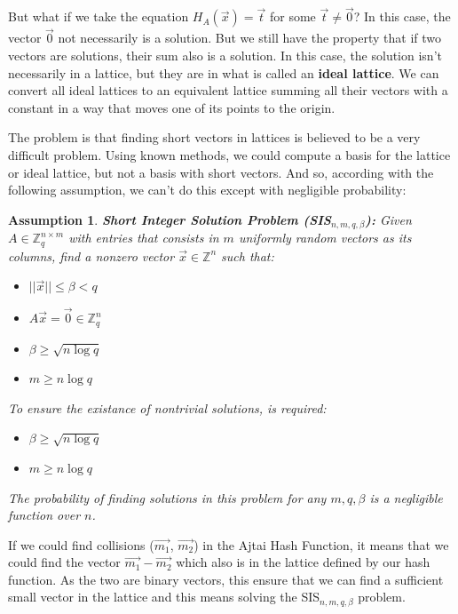 \documentclass[a4paper]{article}
\newtheorem{assumption}{Assumption}
\begin{document}
But what if we take the equation $H_A(\overrightarrow{x})=\overrightarrow{t}$ for some $\overrightarrow{t}\neq\overrightarrow{0}$? In this case, the vector $\overrightarrow{0}$ not necessarily is a solution. But we still have the property that if two vectors are solutions, their sum also is a solution. In this case, the solution isn't necessarily in a lattice, but they are in what is called an \textbf{ideal lattice}. We can convert all ideal lattices to an equivalent lattice summing all their vectors with a constant in a way that moves one of its points to the origin.

The problem is that finding short vectors in lattices is believed to be a very difficult problem. Using known methods, we could compute a basis for the lattice or ideal lattice, but not a basis with short vectors. And so, according with the following assumption, we can't do this except with negligible probability:

\begin{assumption}
\textbf{Short Integer Solution Problem (SIS$_{n, m, q, \beta}$): }Given $A \in \mathbb{Z}_q^{n \times m}$ with entries that consists in $m$ uniformly random vectors as its columns, find a nonzero vector $\overrightarrow{x} \in \mathbb{Z}^n$ such that:

\begin{itemize}
    \item $||\overrightarrow{x}||\leq \beta < q$
    \item $A\overrightarrow{x}=\overrightarrow{0} \in \mathbb{Z}_q^n$
    \item $\beta \geq \sqrt{n\log q}$
    \item $m \geq n \log q$
\end{itemize}

To ensure the existance of nontrivial solutions, is required:

\begin{itemize}
    \item $\beta \geq \sqrt{n\log q}$
    \item $m \geq n \log q$
\end{itemize}

The probability of finding solutions in this problem for any $m, q, \beta$ is a negligible function over $n$.
\end{assumption}

If we could find collisions ($\overrightarrow{m_1}$, $\overrightarrow{m_2}$) in the Ajtai Hash Function, it means that we could find the vector $\overrightarrow{m_1}-\overrightarrow{m_2}$ which also is in the lattice defined by our hash function. As the two are binary vectors, this ensure that we can find a sufficient small vector in the lattice and this means solving the SIS$_{n, m, q, \beta}$ problem.
\end{document}
